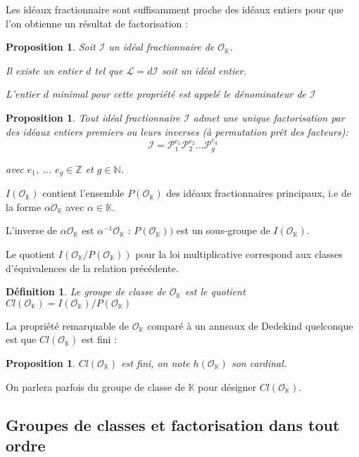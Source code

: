 \documentclass{article}
\newcommand{\N}[0]{\mathbb{N}}
\newcommand{\Z}[0]{\mathbb{Z}}
\newcommand{\K}[0]{\mathbb{K}}
\newcommand{\OR}[0]{\mathcal{O}}
\newcommand{\LR}[0]{\mathcal{L}}
\newcommand{\PR}[0]{\mathcal{P}}
\newcommand{\IR}[0]{\mathcal{I}}
\newtheorem{Prop}[The]{Proposition}
\newtheorem{Def}[The]{Définition}
\begin{document}
Les idéaux fractionnaire sont suffisamment proche des idéaux entiers pour que l'on obtienne un résultat de factorisation :

\begin{Prop}
	Soit $\IR$ un idéal fractionnaire de $\OR_{\K}$.
	
	 Il existe un entier $d$ tel que $\LR = d\IR$ soit un idéal entier.
	 
	 L'entier $d$ minimal pour cette propriété est appelé le dénominateur de $\IR$
\end{Prop}

\begin{Prop}
	Tout idéal fractionnaire $\IR$ admet une unique factorisation par des idéaux entiers premiers ou leurs inverses (à permutation prêt des facteurs):
	\begin{equation*}
		\IR = \PR_{1}^{e_{1}}\PR_{2}^{e_{2}}\ldots\PR_{g}^{e_{g}}
	\end{equation*}
	
	avec $e_{1}$, ... $e_{g}\in\Z$ et $g\in\N$.
	
\end{Prop}

$I(\OR_{\K})$ contient l'ensemble $P(\OR_{\K})$ des idéaux fractionnaires principaux, i.e de la forme $\alpha\OR_{\K}$ avec $\alpha\in\K$. 

L'inverse de $\alpha\OR_{\K}$ est $\alpha^{-1}\OR_{\K}$ : $P(\OR_{\K}))$ est un sous-groupe de $I(\OR_{\K})$.

Le quotient $I(\OR_{\K}/P(\OR_{\K}))$ pour la loi multiplicative correspond aux classes d'équivalences de la relation précédente.

\begin{Def}
	Le groupe de classe de $\OR_{\K}$ est le quotient $Cl(\OR_{\K}) =  I(\OR_{\K})/P(\OR_{\K})$
\end{Def}

La propriété remarquable de $\OR_{\K}$ comparé à un anneaux de Dedekind quelconque est que $Cl(\OR_{\K})$ est fini :

\begin{Prop}
	$Cl(\OR_{\K})$ est fini, on note $h(\OR_{\K})$ son cardinal. 
\end{Prop} 

On parlera parfois du groupe de classe de $\K$ pour désigner $Cl(\OR_{\K})$.

\subsection{Groupes de classes et factorisation dans tout ordre}
\end{document}
